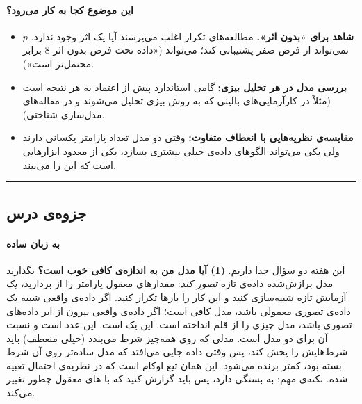 \paragraph{این موضوع کجا به کار می‌رود؟}

\begin{itemize}
\tightlist
\item
  \textbf{شاهد برای «بدون اثر».} مطالعه‌های تکرار  اغلب
  می‌پرسند آیا یک اثر وجود ندارد. \(p\) نمی‌تواند از فرض صفر
  پشتیبانی کند؛  می‌تواند («داده تحت فرض بدون اثر 8
  برابر محتمل‌تر است»).
\item
  \textbf{بررسی مدل در هر تحلیل بیزی:} 
  گامی استاندارد پیش از اعتماد به هر نتیجه است (مثلاً در کارآزمایی‌های
  بالینی که به روش بیزی تحلیل می‌شوند و در مقاله‌های مدل‌سازی شناختی).
\item
  \textbf{مقایسه‌ی نظریه‌هایی با انعطاف متفاوت:} وقتی دو مدل تعداد پارامتر
  یکسانی دارند ولی یکی می‌تواند الگوهای داده‌ی خیلی بیشتری بسازد،
   یکی از معدود ابزارهایی است که این را می‌بیند.
\end{itemize}

\begin{center}\rule{0.5\linewidth}{0.5pt}\end{center}


\subsection{جزوه‌ی درس}

\paragraph{به زبان ساده}

این هفته دو سؤال جدا داریم. \textbf{(1) آیا مدل من به اندازه‌ی کافی خوب
است؟} بگذارید مدل برازش‌شده داده‌ی تازه \emph{تصور کند}: مقدارهای معقول
پارامتر را از  بردارید، یک آزمایش تازه شبیه‌سازی کنید و این
کار را بارها تکرار کنید. اگر داده‌ی واقعی شبیه یک داده‌ی تصوری معمولی
باشد، مدل کافی است؛ اگر داده‌ی واقعی بیرون از ابر داده‌های تصوری باشد، مدل
چیزی را از قلم انداخته است. این یک \textbf{} است. این عدد \textbf{} است و نسبت آن
برای دو مدل \textbf{} است. مدلی که روی همه‌چیز شرط
می‌بندد (خیلی منعطف) باید شرط‌هایش را پخش کند، پس وقتی داده جایی می‌افتد که
مدل ساده‌تر روی آن شرط بسته بود، کمتر برنده می‌شود. این همان تیغ اوکام است
که در نظریه‌ی احتمال تعبیه شده. نکته‌ی مهم:  به
 بستگی دارد، پس باید گزارش کنید که با های معقول چطور
تغییر می‌کند.

